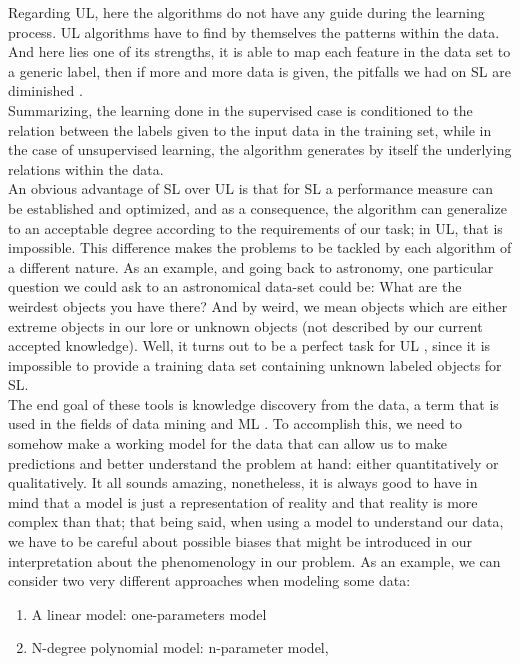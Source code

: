 Regarding UL, here the algorithms do not have any guide during the learning process. UL algorithms have to find by themselves the patterns within the data. And here lies one of its strengths, it is able to map each feature in the data set to a generic label, then if more and more data is given, the pitfalls we had on SL are diminished \cite{Patel2019}.\\

Summarizing, the learning done in the supervised case is conditioned to the relation between the labels given to the input data in the training set, while in the case of unsupervised learning, the algorithm generates by itself the underlying relations within the data.\\

An obvious advantage of SL over UL is that for SL a performance measure can be established and optimized, and as a consequence, the algorithm can generalize to an acceptable degree according to the requirements of our task; in UL, that is impossible. This difference makes the problems to be tackled by each algorithm of a different nature. As an example, and going back to astronomy, one particular question we could ask to an astronomical data-set could be: What are the weirdest objects you have there? And by weird, we mean objects which are either extreme objects in our lore or unknown objects (not described by our current accepted knowledge). Well, it turns out to be a perfect task for UL \cite{Baron2017}, since it is impossible to provide a training data set containing unknown labeled objects for SL.\\

The end goal of these tools is knowledge discovery from the data, a term that is used in the fields of data mining and ML \cite{Ivezic2017}. To accomplish this, we need to somehow make a working model for the data that can allow us to make predictions and better understand the problem at hand: either quantitatively or qualitatively. It all sounds amazing, nonetheless, it is always good to have in mind that a model is just a representation of reality and that reality is more complex than that; that being said, when using a model to understand our data, we have to be careful about possible biases that might be introduced in our interpretation about the phenomenology in our problem. As an example, we can consider two very different approaches when modeling some data:

\begin{enumerate}
    \item A linear model: one-parameters model
    \item N-degree polynomial model: n-parameter model,
\end{enumerate}

